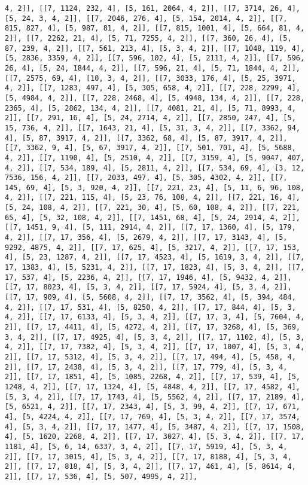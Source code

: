 \documentclass[12pt,fleqn]{article}\usepackage{../../common}
\begin{document}
\begin{verbatim}
4, 2]], [[7, 1124, 232, 4], [5, 161, 2064, 4, 2]], [[7, 3714, 26, 4], [5, 24, 3, 4, 2]], [[7, 2046, 276, 4], [5, 154, 2014, 4, 2]], [[7, 815, 827, 4], [5, 987, 81, 4, 2]], [[7, 815, 1001, 4], [5, 664, 81, 4, 2]], [[7, 2262, 21, 4], [5, 71, 7255, 4, 2]], [[7, 360, 26, 4], [5, 87, 239, 4, 2]], [[7, 561, 213, 4], [5, 3, 4, 2]], [[7, 1048, 119, 4], [5, 2836, 3359, 4, 2]], [[7, 596, 102, 4], [5, 2111, 4, 2]], [[7, 596, 26, 4], [5, 24, 1844, 4, 2]], [[7, 596, 21, 4], [5, 71, 1844, 4, 2]], [[7, 2575, 69, 4], [10, 3, 4, 2]], [[7, 3033, 176, 4], [5, 25, 3971, 4, 2]], [[7, 1283, 497, 4], [5, 305, 658, 4, 2]], [[7, 228, 2299, 4], [5, 4984, 4, 2]], [[7, 228, 2468, 4], [5, 4948, 134, 4, 2]], [[7, 228, 2365, 4], [5, 2862, 134, 4, 2]], [[7, 4081, 21, 4], [5, 71, 8993, 4, 2]], [[7, 291, 16, 4], [5, 24, 2714, 4, 2]], [[7, 2850, 247, 4], [5, 15, 736, 4, 2]], [[7, 1643, 21, 4], [5, 31, 3, 4, 2]], [[7, 3362, 94, 4], [5, 87, 3917, 4, 2]], [[7, 3362, 68, 4], [5, 87, 3917, 4, 2]], [[7, 3362, 9, 4], [5, 67, 3917, 4, 2]], [[7, 501, 701, 4], [5, 5688, 4, 2]], [[7, 1190, 4], [5, 2510, 4, 2]], [[7, 3159, 4], [5, 9047, 407, 4, 2]], [[7, 534, 189, 4], [5, 2811, 4, 2]], [[7, 534, 69, 4], [3, 12, 7536, 156, 4, 2]], [[7, 2033, 497, 4], [5, 305, 4302, 4, 2]], [[7, 145, 69, 4], [5, 3, 920, 4, 2]], [[7, 221, 23, 4], [5, 11, 6, 96, 108, 4, 2]], [[7, 221, 115, 4], [5, 23, 76, 108, 4, 2]], [[7, 221, 16, 4], [5, 24, 108, 4, 2]], [[7, 221, 30, 4], [5, 60, 108, 4, 2]], [[7, 221, 65, 4], [5, 32, 108, 4, 2]], [[7, 1451, 68, 4], [5, 24, 2914, 4, 2]], [[7, 1451, 9, 4], [5, 111, 2914, 4, 2]], [[7, 17, 1360, 4], [5, 179, 4, 2]], [[7, 17, 356, 4], [5, 2679, 4, 2]], [[7, 17, 3143, 4], [5, 9292, 4875, 4, 2]], [[7, 17, 625, 4], [5, 3217, 4, 2]], [[7, 17, 153, 4], [5, 23, 1287, 4, 2]], [[7, 17, 4523, 4], [5, 1619, 3, 4, 2]], [[7, 17, 1383, 4], [5, 5231, 4, 2]], [[7, 17, 1823, 4], [5, 3, 4, 2]], [[7, 17, 537, 4], [5, 2236, 4, 2]], [[7, 17, 1946, 4], [5, 9432, 4, 2]], [[7, 17, 8023, 4], [5, 3, 4, 2]], [[7, 17, 5924, 4], [5, 3, 4, 2]], [[7, 17, 909, 4], [5, 5608, 4, 2]], [[7, 17, 3562, 4], [5, 394, 484, 4, 2]], [[7, 17, 531, 4], [5, 8250, 4, 2]], [[7, 17, 844, 4], [5, 3, 4, 2]], [[7, 17, 6133, 4], [5, 3, 4, 2]], [[7, 17, 3, 4], [5, 7604, 4, 2]], [[7, 17, 4411, 4], [5, 4272, 4, 2]], [[7, 17, 3268, 4], [5, 369, 3, 4, 2]], [[7, 17, 4925, 4], [5, 3, 4, 2]], [[7, 17, 1102, 4], [5, 3, 4, 2]], [[7, 17, 7382, 4], [5, 3, 4, 2]], [[7, 17, 1007, 4], [5, 3, 4, 2]], [[7, 17, 5312, 4], [5, 3, 4, 2]], [[7, 17, 494, 4], [5, 458, 4, 2]], [[7, 17, 2438, 4], [5, 3, 4, 2]], [[7, 17, 779, 4], [5, 3, 4, 2]], [[7, 17, 1851, 4], [5, 1085, 2268, 4, 2]], [[7, 17, 539, 4], [5, 1248, 4, 2]], [[7, 17, 1324, 4], [5, 4848, 4, 2]], [[7, 17, 4582, 4], [5, 3, 4, 2]], [[7, 17, 1743, 4], [5, 5562, 4, 2]], [[7, 17, 2189, 4], [5, 6521, 4, 2]], [[7, 17, 2343, 4], [5, 3, 99, 4, 2]], [[7, 17, 671, 4], [5, 4224, 4, 2]], [[7, 17, 769, 4], [5, 3, 4, 2]], [[7, 17, 3574, 4], [5, 3, 4, 2]], [[7, 17, 1477, 4], [5, 3487, 4, 2]], [[7, 17, 1508, 4], [5, 1620, 2268, 4, 2]], [[7, 17, 3027, 4], [5, 3, 4, 2]], [[7, 17, 1181, 4], [5, 6, 14, 6337, 3, 4, 2]], [[7, 17, 5919, 4], [5, 3, 4, 2]], [[7, 17, 3015, 4], [5, 3, 4, 2]], [[7, 17, 8188, 4], [5, 3, 4, 2]], [[7, 17, 818, 4], [5, 3, 4, 2]], [[7, 17, 461, 4], [5, 8614, 4, 2]], [[7, 17, 536, 4], [5, 507, 4995, 4, 2]], 
\end{verbatim}
\end{document}
